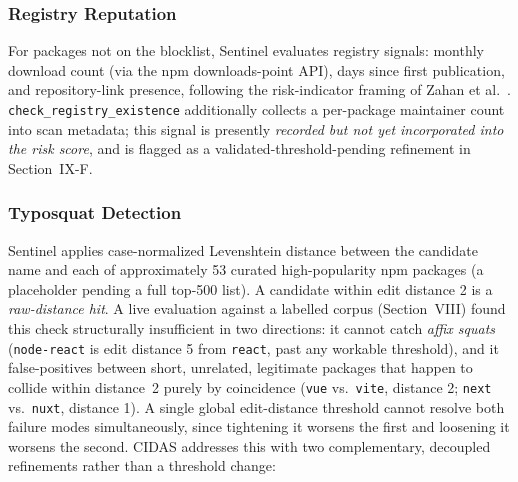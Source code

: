 \documentclass[journal]{IEEEtran}
\begin{document}
\subsubsection{Registry Reputation}
For packages not on the blocklist, Sentinel evaluates registry signals: monthly download count (via the npm
downloads-point API), days since first publication, and repository-link presence, following the
risk-indicator framing of Zahan et al.~\cite{zahan2022}. \texttt{check\_registry\_existence} additionally
collects a per-package maintainer count into scan metadata; this signal is presently \emph{recorded but not
yet incorporated into the risk score}, and is flagged as a validated-threshold-pending refinement in
Section~IX-F.

\subsubsection{Typosquat Detection}
Sentinel applies case-normalized Levenshtein distance between the candidate name and each of approximately
53 curated high-popularity npm packages (a placeholder pending a full top-500 list). A candidate within edit
distance 2 is a \emph{raw-distance hit}. A live evaluation against a labelled corpus (Section~VIII) found
this check structurally insufficient in two directions: it cannot catch \emph{affix squats}
(\texttt{node-react} is edit distance 5 from \texttt{react}, past any workable threshold), and it
false-positives between short, unrelated, legitimate packages that happen to collide within distance~2
purely by coincidence (\texttt{vue} vs.\ \texttt{vite}, distance 2; \texttt{next} vs.\ \texttt{nuxt},
distance 1). A single global edit-distance threshold cannot resolve both failure modes simultaneously, since
tightening it worsens the first and loosening it worsens the second. CIDAS addresses this with two
complementary, decoupled refinements rather than a threshold change:
\end{document}
